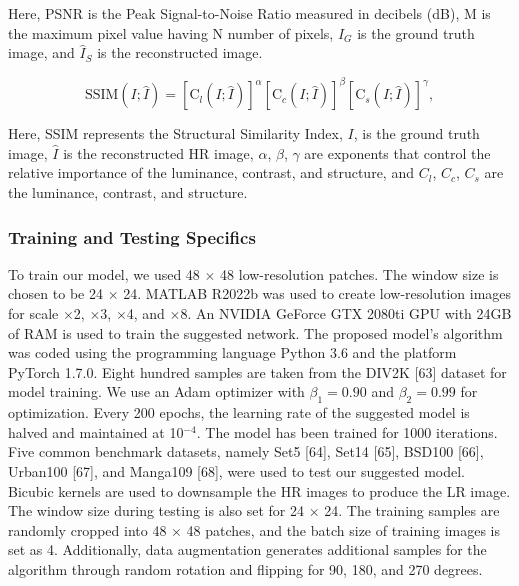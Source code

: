 \documentclass[twocolumn]{svjour3}          %
\begin{document}
Here, PSNR is the Peak Signal-to-Noise Ratio measured in decibels (dB), M is the maximum pixel value having N number of pixels, ${I_{G}}$ is the ground truth image, and ${\hat{I}_{S}}$ is the reconstructed image.

\begin{equation}
\text{SSIM}(I; \hat{I}) = \left[ \text{C}_{l}(I; \hat{I}) \right]^\alpha \left[ \text{C}_{c}(I; \hat{I}) \right]^\beta \left[ \text{C}_{s}(I; \hat{I}) \right]^\gamma,
\end{equation}

Here, SSIM represents the Structural Similarity Index, $I$, is the ground truth image, $\hat{I}$ is the reconstructed HR image, $\alpha$, $\beta$, $\gamma$ are exponents that control the relative importance of the luminance, contrast, and structure, and ${C}_{l}$, ${C}_{c}$, ${C}_{s}$ are the luminance, contrast, and structure.

\subsubsection{Training and Testing Specifics}

To train our model, we used 48 $\times$ 48 low-resolution patches. The window size is chosen to be 24 $\times$ 24. MATLAB R2022b was used to create low-resolution images for scale $\times$2, $\times$3, $\times$4, and $\times$8. An NVIDIA GeForce GTX 2080ti GPU with 24GB of RAM is used to train the suggested network. The proposed model's algorithm was coded using the programming language Python 3.6 and the platform PyTorch 1.7.0. Eight hundred samples are taken from the DIV2K [63] dataset for model training. We use an Adam optimizer with $\beta_1 = 0.90$ and $\beta_2 = 0.99$ for optimization. Every 200 epochs, the learning rate of the suggested model is halved and maintained at 10$^{-4}$. The model has been trained for 1000 iterations.
Five common benchmark datasets, namely Set5 [64], Set14 [65], BSD100 [66], Urban100 [67], and Manga109 [68], were used to test our suggested model. Bicubic kernels are used to downsample the HR images to produce the LR image. The window size during testing is also set for 24 $\times$ 24. The training samples are randomly cropped into 48 $\times$ 48 patches, and the batch size of training images is set as 4. Additionally, data augmentation generates additional samples for the algorithm through random rotation and flipping for 90, 180, and 270 degrees.
\end{document}
